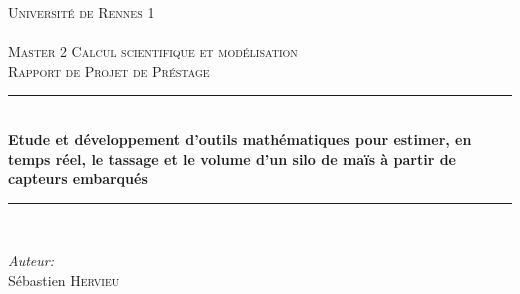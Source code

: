 \documentclass[12pt,a4paper]{report}
\author{Sébastien Hervieu}
\begin{document}
	
\newcommand{\todoRediger}[1]{\todo[color=red,inline]{REDIGER #1}}
\newcommand{\todoARevoir}[1]{\todo[color=red,inline]{A REVOIR #1}}
\newcommand{\todoCompleter}[1]{\todo[inline]{COMPLETER #1}}
\newcommand{\todoAmeliorer}[1]{\todo{AMELIORER: #1}}
\newcommand{\todoMiseEnForme}[1]{\todo[color=green,inline]{MISE EN FORME: #1}}
\newcommand{\todoCheck}[1]{\todo[color=cyan,fancyline]{VERIFIER #1}}
\newcommand{\todoAjouterRef}[1]{\todo[color=pink]{AJOUTER REF #1}}
\newcommand{\todoTrouverRefExt}[1]{\todo[color=red,inline]{TROUVER REF EXTERNE: #1}}
\newcommand{\todoObjectif}[1]{\todo[color=yellow,inline,size=\Large]{OBJECTIF: #1}}
\newcommand{\todoPeutEtre}[1]{\todo[color=teal,inline]{PEUT ETRE #1 ?}}

\begin{titlepage}

\newcommand{\HRule}{\rule{\linewidth}{0.5mm}} %

\center %
 

\textsc{\LARGE Université de Rennes 1}\\[1cm] 
\textsc{\Large }\\[0.5cm] %
\textsc{\large Master 2 Calcul scientifique et modélisation}\\
\textsc{Rapport de Projet de Préstage}\\

\HRule \\[0.4cm]
{ \huge \bfseries Etude et développement d’outils mathématiques pour estimer, en temps réel, le tassage et le volume d’un silo de maïs à partir de capteurs embarqués}\\[0.4cm] 
\HRule \\[1.5cm]
 

\begin{minipage}{0.4\textwidth}
\begin{flushleft} \large
\emph{Auteur:}\\
Sébastien \textsc{Hervieu}
\end{flushleft}
\end{minipage}
~
\begin{minipage}{0.4\textwidth}


\end{minipage}
\end{titlepage}
\end{document}

